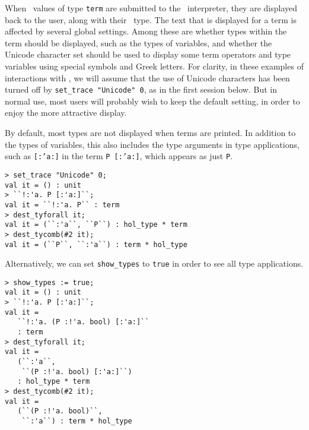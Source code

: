 When \ML\ values of type {\small\verb|term|} are submitted to the \ML\ 
interpreter, they are displayed back to the user, along with their \ML\ type.
The text that is displayed for a term is
affected by several global
settings.
Among these are whether types within the term should be displayed,
such as the types of variables,
and whether the Unicode character set should be used to display some term
operators and type variables using special symbols and Greek letters.
For
clarity, in these examples
of interactions with \HOLW,
we will assume that the use of Unicode characters has been turned
off
by \texttt{set\_trace~"Unicode"~0}, as in the first session below.
But in normal use, most users will probably wish to keep the 
default setting, in order to enjoy the more attractive display.

\setcounter{sessioncount}{0}

By default, most types are not displayed
when terms are printed.
In addition to the types of variables,
this also includes the type arguments in type applications,
such as \texttt{[:'a:]} in the term \texttt{P [:'a:]}, which appears as just
\texttt{P}.

\begin{session}
\begin{verbatim}
> set_trace "Unicode" 0;
val it = () : unit
> ``!:'a. P [:'a:]``;
val it = ``!:'a. P`` : term
> dest_tyforall it;
val it = (``:'a``, ``P``) : hol_type * term
> dest_tycomb(#2 it);
val it = (``P``, ``:'a``) : term * hol_type
\end{verbatim}
\end{session}

Alternatively, we can set \texttt{show\_types} to \texttt{true}
in order
to see
all type applications.

\begin{session}
\begin{verbatim}
> show_types := true;
val it = () : unit
> ``!:'a. P [:'a:]``;
val it =
   ``!:'a. (P :!'a. bool) [:'a:]``
   : term
> dest_tyforall it;
val it =
   (``:'a``,
    ``(P :!'a. bool) [:'a:]``)
   : hol_type * term
> dest_tycomb(#2 it);
val it =
   (``(P :!'a. bool)``,
    ``:'a``) : term * hol_type
\end{verbatim}
\end{session}

